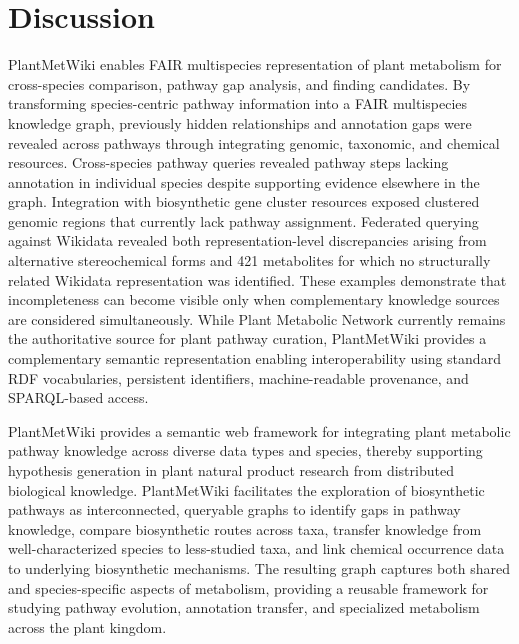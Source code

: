 \documentclass[11pt,a4paper]{article}
\begin{document}
\section*{Discussion}

PlantMetWiki enables FAIR multispecies representation of plant metabolism for cross-species comparison, pathway gap analysis, and finding candidates. By transforming species-centric pathway information into a FAIR multispecies knowledge graph, previously hidden relationships and annotation gaps were revealed across pathways through integrating genomic, taxonomic, and chemical resources. Cross-species pathway queries revealed pathway steps lacking
annotation in individual species despite supporting evidence elsewhere in the graph. Integration with
biosynthetic gene cluster resources exposed clustered genomic regions that currently lack pathway
assignment. Federated querying against Wikidata revealed both representation-level discrepancies
arising from alternative stereochemical forms and 421 metabolites for which no structurally related
Wikidata representation was identified. These examples demonstrate that incompleteness can become visible
only when complementary knowledge sources are considered simultaneously. 
While Plant Metabolic Network currently remains the authoritative source for plant pathway
curation, PlantMetWiki provides a complementary semantic representation enabling
interoperability using standard RDF vocabularies, persistent identifiers,
machine-readable provenance, and SPARQL-based access. 


PlantMetWiki provides a semantic web framework for integrating plant metabolic pathway knowledge across
diverse data types and species, thereby supporting hypothesis generation in plant natural
product research from distributed biological knowledge. PlantMetWiki facilitates the exploration of
biosynthetic pathways as interconnected, queryable graphs to identify gaps in pathway knowledge, compare biosynthetic routes
across taxa, transfer knowledge from well-characterized species to less-studied taxa, and link
chemical occurrence data to underlying biosynthetic mechanisms. The resulting graph captures both
shared and species-specific aspects of metabolism, providing a reusable framework for studying
pathway evolution, annotation transfer, and specialized metabolism across the plant kingdom. 
\end{document}
